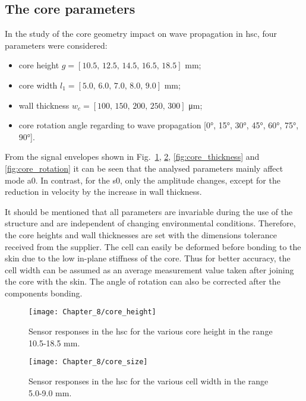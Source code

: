 \subsection{The core parameters}
In the study of the core geometry impact on wave propagation in \ac{hsc}, four parameters were considered:
\begin{itemize}
	\item core height \(g=[10.5,\,12.5,\,14.5,\,16.5,\,18.5]\) \unit{\mm};
	\item core width \(l_1=[5.0,\,6.0,\,7.0,\,8.0,\,9.0]\) \unit{\mm};
	\item wall thickness \(w_c=[100,\,150,\,200,\,250,\,300]\) \unit{\micro\m};
	\item core rotation angle regarding to wave propagation [\ang{0}, \ang{15}, \ang{30}, \ang{45}, \ang{60}, \ang{75}, \ang{90}].
\end{itemize}

From the signal envelopes shown in Fig.~\ref{fig:core_height}, \ref{fig:core_size}, \ref{fig:core_thickness} and \ref{fig:core_rotation} it can be seen that the analysed parameters mainly affect mode \ac{a0}. 
In contrast, for the \ac{s0}, only the amplitude changes, except for the reduction in velocity by the increase in wall thickness.

It should be mentioned that all parameters are invariable during the use of the structure and are independent of changing environmental conditions.
Therefore, the core heights and wall thicknesses are set with the dimensions tolerance received from the supplier.
The cell can easily be deformed before bonding to the skin due to the low in-plane stiffness of the core.
Thus for better accuracy, the cell width can be assumed as an average measurement value taken after joining the core with the skin.
The angle of rotation can also be corrected after the components bonding.
\begin{figure}
	\begin{center}
		\texttt{[image: Chapter\_8/core\_height]}
	\end{center}
	\caption{Sensor responses in the \acf{hsc} for the various core height in the range 10.5-18.5 \unit{\mm}.}
	\label{fig:core_height}
\end{figure}

\begin{figure}
	\begin{center}
		\texttt{[image: Chapter\_8/core\_size]}
	\end{center}
	\caption{Sensor responses in the \acf{hsc} for the various cell width in the range 5.0-9.0 \unit{\mm}.}
	\label{fig:core_size}
\end{figure}

